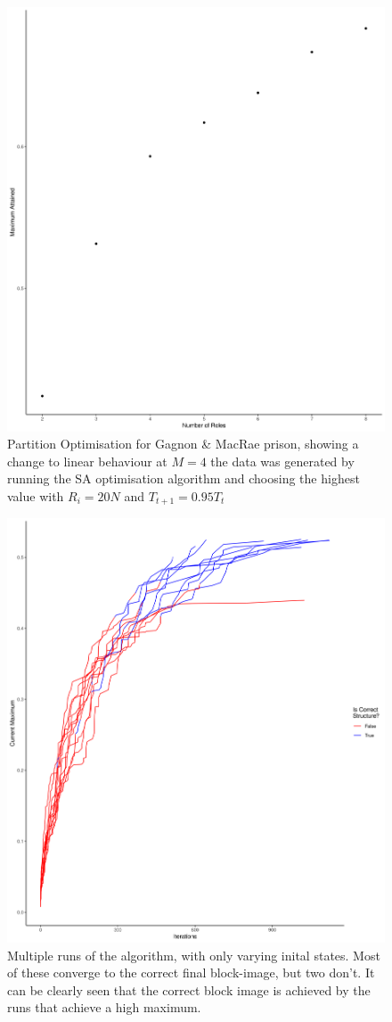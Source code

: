 \documentclass[9pt,twocolumn,twoside,lineno]{pnas-new}
\begin{document}
\begin{figure}%
\centering
\includegraphics[width=.8\linewidth]{figures/prison_maxima_roles}
\caption{Partition Optimisation for Gagnon \& MacRae prison, showing a change to linear behaviour at $M =4$ the data was generated by running the SA optimisation algorithm and choosing the highest value with $R_i = 20N$ and  $T_{t + 1} = 0.95 T_t$}
\label{fig:roles}
\end{figure}


\begin{figure}%
\centering
\includegraphics[width=.8\linewidth]{figures/multiple_runs}
\caption{Multiple runs of the algorithm, with only varying inital states. Most of these converge to the correct final block-image, but two don't. It can be clearly seen that the correct block image is achieved by the runs that achieve a high maximum.}
\label{fig:multiple_runs}
\end{figure}
\end{document}
